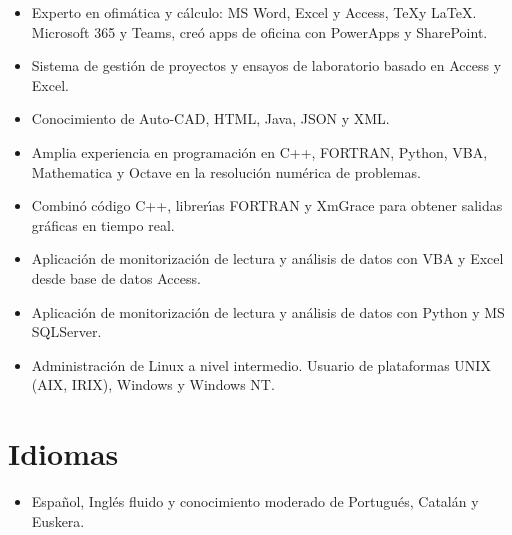 \documentclass{article}
\begin{document}
\begin{itemize}\itemsep 0pt
\item Experto en ofim\'atica y c\'alculo: MS Word, Excel y Access, \TeX y \LaTeX.
Microsoft 365 y Teams, cre\'o apps de oficina con PowerApps y SharePoint.

\item Sistema de gesti\'on de proyectos y ensayos de laboratorio basado en Access y Excel.

\item Conocimiento de Auto-CAD, HTML, Java, JSON y XML.

\item Amplia experiencia en programaci\'{o}n en C++, FORTRAN, Python, VBA, Mathematica y Octave en la resoluci\'{o}n num\'{e}rica de pro\-ble\-mas.

\item Combin\'{o} c\'{o}digo C++, librer\'{\i}as FORTRAN y XmGrace para obtener salidas gr\'{a}ficas en tiempo real.

\item Aplicaci\'on de monitorizaci\'on de lectura y an\'alisis de datos con VBA y Excel desde base de datos Access.

\item Aplicaci\'on de monitorizaci\'on de lectura y an\'alisis de datos con Python y MS SQLServer.

\item Administraci\'{o}n de Linux a nivel intermedio.  
Usuario de plataformas UNIX (AIX, IRIX), Windows y Windows NT.
\end{itemize}



\section*{Idiomas}
\begin{itemize}\itemsep 0pt
\item Espa\~nol, Ingl\'{e}s fluido y conocimiento moderado de Portugu\'es, 
Catal\'{a}n y Euskera.
\end{itemize}

\end{document}
